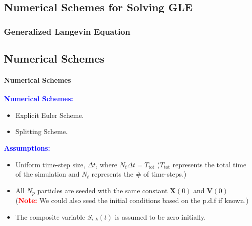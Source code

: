 \documentclass[a4paper,10pt]{beamer}
\newcommand{\BS}[1]{\boldsymbol{#1}}
\begin{document}
	\begin{frame}
		\section{Numerical Schemes for Solving GLE}
		\frametitle{Generalized Langevin Equation}
		\subsection{Numerical Schemes}
		\framesubtitle{Numerical Schemes}
		\textcolor{blue}{\textbf{Numerical Schemes:}}
		\begin{itemize}
			\item {Explicit Euler Scheme.}
			\item {Splitting Scheme.}
		\end{itemize}
		\textcolor{blue}{\textbf{Assumptions:}}
		\begin{itemize}
			\item {Uniform time-step size, $\Delta t$, where $N_{t} \Delta t = T_{\text{tot}}$ ($T_{\text{tot}}$ represents the total time of the simulation and $N_{t}$ represents the \# of time-steps.)}
			\item {All $N_{p}$ particles are seeded with the same constant $\BS{X}(0)$ and $\BS{V}(0)$ (\textcolor{red}{\textbf{Note:}} We could also seed the initial conditions based on the p.d.f if known.)}
			\item {The composite variable $S_{i,k}(t)$ is assumed to be zero initially.}
		\end{itemize}
	\end{frame}
	
\end{document}
